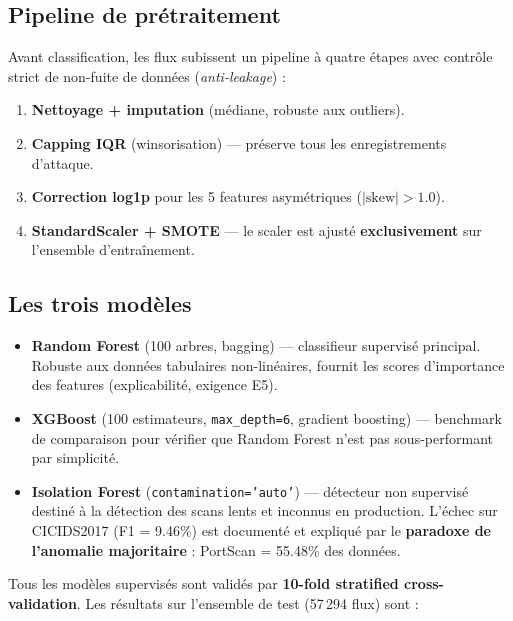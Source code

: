\documentclass[12pt,a4paper]{article}
\begin{document}
\subsection{Pipeline de pr\'{e}traitement}

Avant classification, les flux subissent un pipeline \`{a} quatre \'{e}tapes
avec contr\^{o}le strict de non-fuite de donn\'{e}es (\textit{anti-leakage}) :

\begin{enumerate}[nosep,leftmargin=1.5em]
  \item \textbf{Nettoyage + imputation} (m\'{e}diane, robuste aux outliers).
  \item \textbf{Capping IQR} (winsorisation) --- pr\'{e}serve tous les
        enregistrements d'attaque.
  \item \textbf{Correction log1p} pour les 5 features asym\'{e}triques
        ($|\text{skew}| > 1.0$).
  \item \textbf{StandardScaler + SMOTE} --- le scaler est ajust\'{e}
        \textbf{exclusivement} sur l'ensemble d'entra\^{i}nement.
\end{enumerate}

\subsection{Les trois mod\`{e}les}

\begin{itemize}[nosep,leftmargin=1.5em]
  \item \textbf{Random Forest} (100 arbres, bagging) --- classifieur supervis\'{e}
        principal. Robuste aux donn\'{e}es tabulaires non-lin\'{e}aires, fournit
        les scores d'importance des features (explicabilit\'{e}, exigence E5).
  \item \textbf{XGBoost} (100 estimateurs, \texttt{max\_depth=6}, gradient boosting)
        --- benchmark de comparaison pour v\'{e}rifier que Random Forest n'est pas
        sous-performant par simplicit\'{e}.
  \item \textbf{Isolation Forest} (\texttt{contamination='auto'}) --- d\'{e}tecteur
        non supervis\'{e} destin\'{e} \`{a} la d\'{e}tection des scans lents et
        inconnus en production. L'\'{e}chec sur CICIDS2017 (F1 = 9.46\%) est
        document\'{e} et expliqu\'{e} par le \textbf{paradoxe de l'anomalie
        majoritaire} : PortScan = 55.48\% des donn\'{e}es.
\end{itemize}

Tous les mod\`{e}les supervis\'{e}s sont valid\'{e}s par \textbf{10-fold
stratified cross-validation}. Les r\'{e}sultats sur l'ensemble de test
(57\,294 flux) sont :
\end{document}
